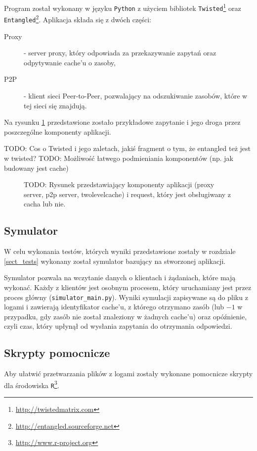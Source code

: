 \documentclass[a4paper,11pt]{scrartcl}
\newcommand{\f}{\texttt}
\newcommand{\s}{ }
\newcommand{\keszu}{cache'u}
\begin{document}
Program został wykonany w języku \f{Python} z użyciem bibliotek \f{Twisted}\footnote{\url{http://twistedmatrix.com}} oraz \f{Entangled}\footnote{\url{http://entangled.sourceforge.net}}. Aplikacja składa się z dwóch części:
\begin{description}
  \item[Proxy]{ - server proxy, który odpowiada za przekazywanie zapytań oraz odpytywanie \keszu\s o zasoby,}
  \item[P2P]{ - klient sieci Peer-to-Peer, pozwalający na odszukiwanie zasobów, które w tej sieci się znajdują.}
\end{description}
Na rysunku \ref{fig_architecture} przedstawione zostało przykładowe zapytanie i jego droga przez poszczególne komponenty aplikacji. 

TODO: Cos o Twisted i jego zaletach, jakiś fragment o tym, że entangled też jest w twisted?
TODO: Możliwość łatwego podmieniania komponentów (np. jak budowany jest cache)

\begin{figure}
\label{fig_architecture}
\caption{TODO: Rysunek przedstawiający komponenty aplikacji (proxy server, p2p server, twolevelcache) i request, który jest obsługiwany z cacha lub nie.}
\end{figure}

\subsection{Symulator}
\label{sect_impl_simulator}
W celu wykonania testów, których wyniki przedstawione zostały w rozdziale \ref{sect_tests} wykonany został symulator bazujący na stworzonej aplikacji. 

Symulator pozwala na wczytanie danych o klientach i żądaniach, które mają wykonać. Każdy z klientów jest osobnym procesem, który uruchamiany jest przez proces główny (\f{simulator\_main.py}). Wyniki symulacji zapisywane są do pliku z logami i zawierają identyfikator \keszu, z którego otrzymano zasób (lub $-1$ w przypadku, gdy zasób nie został znaleziony w żadnych \keszu) oraz opóźnienie, czyli czas, który upłynął od wysłania zapytania do otrzymania odpowiedzi.

\subsection{Skrypty pomocnicze}
Aby ułatwić przetwarzania plików z logami zostały wykonane pomocnicze skrypty dla środowiska \f{R}\footnote{\url{http://www.r-project.org}}. 
\end{document}
